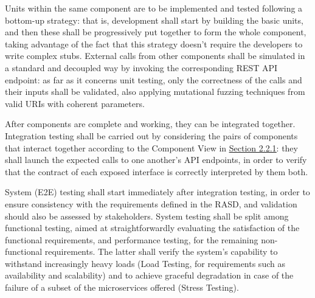 Units within the same component are to be implemented and tested following a bottom-up strategy: that is, development shall start by building the basic units, and then these shall be progressively put together to form the whole component, taking advantage of the fact that this strategy doesn't require the developers to write complex stubs. External calls from other components shall be simulated in a standard and decoupled way by invoking the corresponding REST API endpoint: as far as it concerns unit testing, only the correctness of the calls and their inputs shall be validated, also applying mutational fuzzing techniques from valid URIs with coherent parameters. 

After components are complete and working, they can be integrated together. Integration testing shall be carried out by considering the pairs of components that interact together according to the Component View in \hyperref[fig:component_diagram]{\protect\uline{Section 2.2.1}}: they shall launch the expected calls to one another's API endpoints, in order to verify that the contract of each exposed interface is correctly interpreted by them both.

System (E2E) testing shall start immediately after integration testing, in order to ensure consistency with the requirements defined in the RASD, and validation should also be assessed by stakeholders. System testing shall be split among functional testing, aimed at straightforwardly evaluating the satisfaction of the functional requirements, and performance testing, for the remaining non-functional requirements. The latter shall verify the system's capability to withstand increasingly heavy loads (Load Testing, for requirements such as availability and scalability) and to achieve graceful degradation in case of the failure of a subset of the microservices offered (Stress Testing).